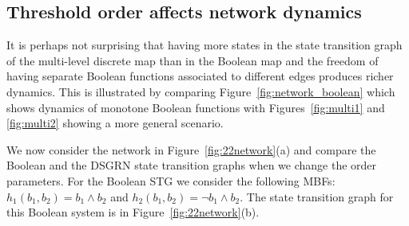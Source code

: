 \documentclass[12pt, notitlepage]{amsart}
\theoremstyle{definition}
\begin{document}
\subsection{Threshold order affects network dynamics}
\label{sec:orders}

It is perhaps not surprising that having more states in the state transition graph of the multi-level discrete map than in the Boolean map and the freedom of having separate Boolean functions associated to different edges produces richer dynamics. This is illustrated by comparing Figure~\ref{fig:network_boolean} which shows dynamics of monotone Boolean functions with Figures~\ref{fig:multi1} and \ref{fig:multi2} showing a more general scenario.

We now consider the network in Figure~\ref{fig:22network}(a) and compare the Boolean and the DSGRN state transition graphs when we change the order parameters. For the Boolean STG we consider the following MBFs: $h_1(b_1, b_2) = b_1 \wedge b_2$ and $h_2(b_1, b_2) = \neg b_1 \wedge b_2$. The state transition graph for this Boolean system is in  Figure~\ref{fig:22network}(b).
\end{document}
